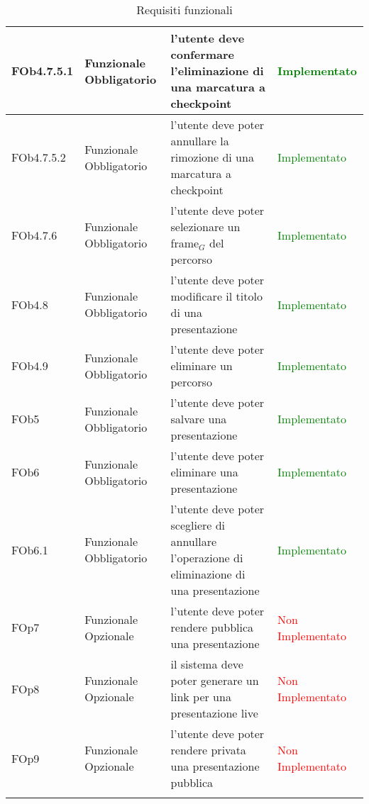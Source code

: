 \begin{longtable}{|l|p{2.5cm}|p{5cm}|p{3.5cm}|}
FOb4.7.5.1 & Funzionale \linebreak Obbligatorio & l'utente deve confermare l'eliminazione di una marcatura a checkpoint &\textcolor{green}{Implementato}  \\
\hline
FOb4.7.5.2 & Funzionale \linebreak Obbligatorio & l'utente deve poter annullare la rimozione di una marcatura a checkpoint & \textcolor{green}{Implementato}  \\
\hline
FOb4.7.6 & Funzionale \linebreak Obbligatorio & l'utente deve poter selezionare un frame$_G$ del percorso & \textcolor{green}{Implementato}  \\
\hline
FOb4.8 & Funzionale \linebreak Obbligatorio & l'utente deve poter modificare il titolo di una presentazione & \textcolor{green}{Implementato}  \\
\hline
FOb4.9 & Funzionale \linebreak Obbligatorio & l'utente deve poter eliminare un percorso & \textcolor{green}{Implementato}  \\
\hline
FOb5 & Funzionale \linebreak Obbligatorio & l'utente deve poter salvare una presentazione & \textcolor{green}{Implementato} \\
\hline
FOb6 & Funzionale \linebreak Obbligatorio & l'utente deve poter eliminare una presentazione & \textcolor{green}{Implementato} \\
\hline
FOb6.1 & Funzionale \linebreak Obbligatorio & l'utente deve poter scegliere di annullare l'operazione di eliminazione di una presentazione & \textcolor{green}{Implementato}  \\
\hline
FOp7 & Funzionale \linebreak Opzionale & l'utente deve poter rendere pubblica una presentazione & \textcolor{red}{Non Implementato} \\
\hline
FOp8 & Funzionale \linebreak Opzionale & il sistema deve poter generare un link per una presentazione live & \textcolor{red}{Non Implementato} \\
\hline
FOp9 & Funzionale \linebreak Opzionale & l'utente deve poter rendere privata una presentazione pubblica & \textcolor{red}{Non Implementato} \\
\hline
\caption{Requisiti funzionali}
\end{longtable}
